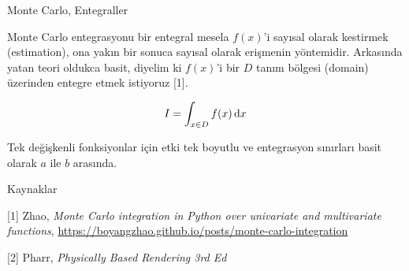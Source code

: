 \documentclass[12pt,fleqn]{article}\usepackage{../../common}
\begin{document}
Monte Carlo, Entegraller

Monte Carlo entegrasyonu bir entegral mesela $f(x)$'i sayısal olarak kestirmek
(estimation), ona yakın bir sonuca sayısal olarak erişmenin
yöntemidir. Arkasında yatan teori oldukca basit, diyelim ki $f(x)$'i bir $D$
tanım bölgesi (domain) üzerinden entegre etmek istiyoruz [1].

$$
I = \int_{x \in D} f(x) \,\mathrm{d} x
$$

Tek değişkenli fonksiyonlar için etki tek boyutlu ve entegrasyon sınırları
basit olarak $a$ ile $b$ arasında.

















Kaynaklar

[1] Zhao, {\em Monte Carlo integration in Python over univariate and multivariate functions},
    \url{https://boyangzhao.github.io/posts/monte-carlo-integration}

[2] Pharr, {\em Physically Based Rendering 3rd Ed}
    
\end{document}
